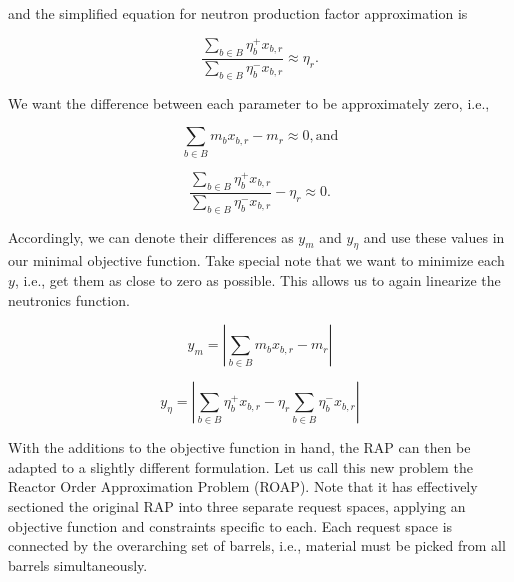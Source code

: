 and the simplified equation for neutron production factor approximation is

\begin{equation*}
\frac{\sum_{b \in B} \eta_{b}^{+} x_{b,r}}
     {\sum_{b \in B} \eta_{b}^{-} x_{b,r}} 
\approx \eta_{r}.
\end{equation*}

We want the difference between each parameter to be approximately zero, i.e.,

\begin{equation*}
  \sum_{b \in B} m_{b} x_{b,r} - m_{r} \approx 0, \mbox{and}
\end{equation*}

\begin{equation*}
\frac{\sum_{b \in B} \eta_{b}^{+} x_{b,r}}
     {\sum_{b \in B} \eta_{b}^{-} x_{b,r}} 
- \eta_{r} \approx 0.
\end{equation*}

Accordingly, we can denote their differences as $y_{m}$ and $y_{\eta}$ and use
these values in our minimal objective function. Take special note that we want
to minimize each $y$, i.e., get them as close to zero as possible. This allows
us to again linearize the neutronics function.

\begin{equation}\label{eqs:mass_obj}
y_{m} = \left|  \sum_{b \in B} m_{b} x_{b,r} - m_{r} \right|
\end{equation}

\begin{equation}\label{eqs:eta_obj}
y_{\eta} = \left| \sum_{b \in B} \eta_{b}^{+} x_{b,r}
- \eta_{r} \sum_{b \in B} \eta_{b}^{-} x_{b,r} \right|
\end{equation}

With the additions to the objective function in hand, the RAP can then be
adapted to a slightly different formulation. Let us call this new problem the
Reactor Order Approximation Problem (ROAP). Note that it has effectively
sectioned the original RAP into three separate request spaces, applying an
objective function and constraints specific to each. Each request space is
connected by the overarching set of barrels, i.e., material must be picked from
all barrels simultaneously.

